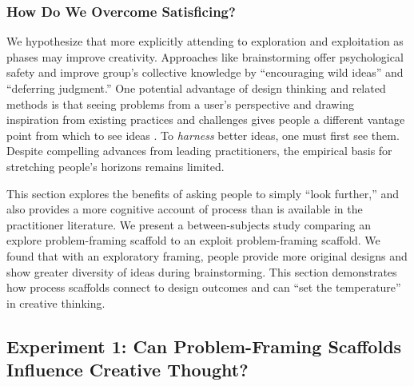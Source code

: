 

\subsubsection{How Do We Overcome Satisficing?}
We hypothesize that more explicitly attending to exploration and exploitation as phases may improve creativity. Approaches like brainstorming offer psychological safety and improve group's collective knowledge by ``encouraging wild ideas'' and ``deferring judgment.'' One potential advantage of design thinking and related methods is that seeing problems from a user's perspective and drawing inspiration from existing practices and challenges gives people a different vantage point from which to see ideas \cite{debono1985, Dow2009, teevan2017}. To \textit{harness} better ideas, one must first see them. Despite compelling advances from leading practitioners, the empirical basis for stretching people's horizons remains limited. 

This section explores the benefits of asking people to simply ``look further,'' and also provides a more cognitive account of process than is available in the practitioner literature. We present a between-subjects study comparing an explore problem-framing scaffold to an exploit problem-framing scaffold. We found that with an exploratory framing, people provide more original designs and show greater diversity of ideas during brainstorming. This section demonstrates how process scaffolds connect to design outcomes and can ``set the temperature'' in creative thinking. 

\subsection{Experiment 1: Can Problem-Framing Scaffolds Influence Creative Thought?}

